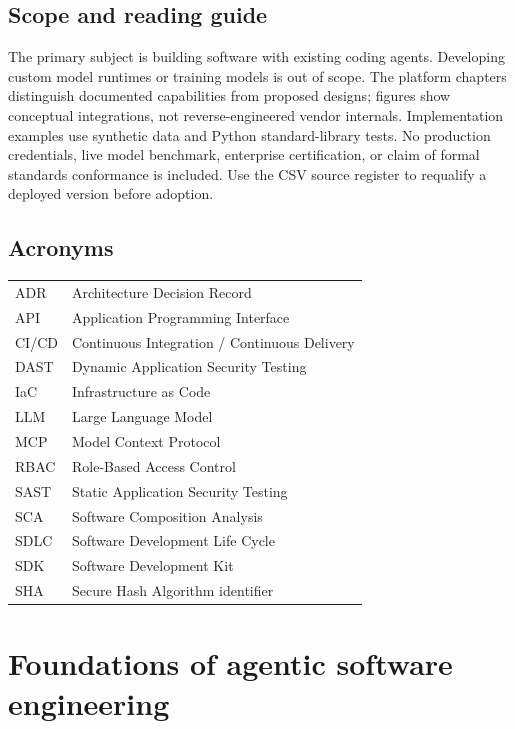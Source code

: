 \documentclass[11pt,oneside,openany]{book}
\begin{document}
\chapter{Scope and reading guide}
The primary subject is building software with existing coding agents. Developing custom model runtimes or training models is out of scope. The platform chapters distinguish documented capabilities from proposed designs; figures show conceptual integrations, not reverse-engineered vendor internals. Implementation examples use synthetic data and Python standard-library tests. No production credentials, live model benchmark, enterprise certification, or claim of formal standards conformance is included. Use the CSV source register to requalify a deployed version before adoption.
\tableofcontents
\listoffigures
\listoftables
\chapter{Acronyms}
\begin{tabular}{ll}
ADR & Architecture Decision Record\\
API & Application Programming Interface\\
CI/CD & Continuous Integration / Continuous Delivery\\
DAST & Dynamic Application Security Testing\\
IaC & Infrastructure as Code\\
LLM & Large Language Model\\
MCP & Model Context Protocol\\
RBAC & Role-Based Access Control\\
SAST & Static Application Security Testing\\
SCA & Software Composition Analysis\\
SDLC & Software Development Life Cycle\\
SDK & Software Development Kit\\
SHA & Secure Hash Algorithm identifier\\
\end{tabular}
\mainmatter


\part{Foundations of agentic software engineering}






\end{document}
